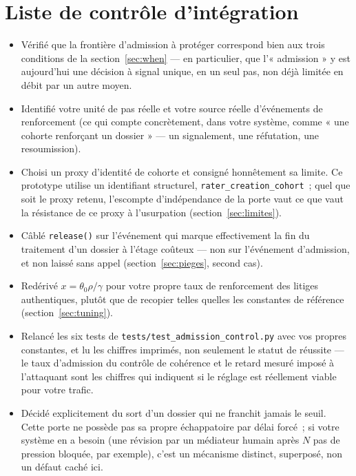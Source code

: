 \documentclass[11pt]{article}
\begin{document}
\section{Liste de contrôle d'intégration}
\label{sec:checklist}

\begin{itemize}
\item[$\square$] Vérifié que la frontière d'admission à protéger
  correspond bien aux trois conditions de la section~\ref{sec:when} ---
  en particulier, que l'« admission » y est aujourd'hui une décision à
  signal unique, en un seul pas, non déjà limitée en débit par un autre
  moyen.
\item[$\square$] Identifié votre unité de pas réelle et votre source
  réelle d'événements de renforcement (ce qui compte concrètement, dans
  votre système, comme « une cohorte renforçant un dossier » --- un
  signalement, une réfutation, une resoumission).
\item[$\square$] Choisi un proxy d'identité de cohorte et consigné
  honnêtement sa limite. Ce prototype utilise un identifiant structurel,
  \texttt{rater\_creation\_cohort}~; quel que soit le proxy retenu,
  l'escompte d'indépendance de la porte vaut ce que vaut la résistance de
  ce proxy à l'usurpation (section~\ref{sec:limites}).
\item[$\square$] Câblé \texttt{release()} sur l'événement qui marque
  effectivement la fin du traitement d'un dossier à l'étage coûteux ---
  non sur l'événement d'admission, et non laissé sans appel
  (section~\ref{sec:pieges}, second cas).
\item[$\square$] Redérivé $x=\theta_0\rho/\gamma$ pour votre propre taux
  de renforcement des litiges authentiques, plutôt que de recopier
  telles quelles les constantes de référence (section~\ref{sec:tuning}).
\item[$\square$] Relancé les six tests de
  \texttt{tests/test\_admission\_control.py} avec vos propres constantes,
  et lu les chiffres imprimés, non seulement le statut de réussite --- le
  taux d'admission du contrôle de cohérence et le retard mesuré imposé à
  l'attaquant sont les chiffres qui indiquent si le réglage est
  réellement viable pour votre trafic.
\item[$\square$] Décidé explicitement du sort d'un dossier qui ne
  franchit jamais le seuil. Cette porte ne possède pas sa propre
  échappatoire par délai forcé~; si votre système en a besoin (une
  révision par un médiateur humain après $N$ pas de pression bloquée, par
  exemple), c'est un mécanisme distinct, superposé, non un défaut caché
  ici.
\end{itemize}
\end{document}
